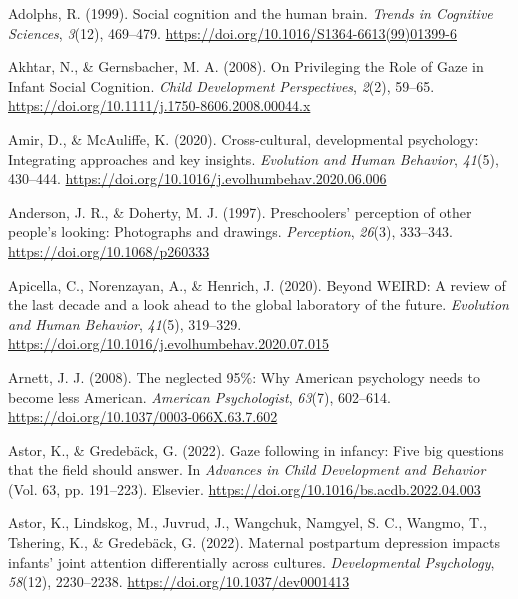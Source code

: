 \documentclass[
  man,floatsintext]{apa7}
\newlength{\cslhangindent}
\newenvironment{CSLReferences}[2] %
 {\begin{list}{}{%
  \setlength{\itemindent}{0pt}
  \setlength{\leftmargin}{0pt}
  \setlength{\parsep}{0pt}
  \ifodd #1
   \setlength{\leftmargin}{\cslhangindent}
   \setlength{\itemindent}{-1\cslhangindent}
  \fi
  \setlength{\itemsep}{#2\baselineskip}}}
 {\end{list}}
\begin{document}
\label{refs}
\begin{CSLReferences}{1}{0}
Adolphs, R. (1999). Social cognition and the human brain. \emph{Trends in Cognitive Sciences}, \emph{3}(12), 469--479. \url{https://doi.org/10.1016/S1364-6613(99)01399-6}

Akhtar, N., \& Gernsbacher, M. A. (2008). On {Privileging} the {Role} of {Gaze} in {Infant Social Cognition}. \emph{Child Development Perspectives}, \emph{2}(2), 59--65. \url{https://doi.org/10.1111/j.1750-8606.2008.00044.x}

Amir, D., \& McAuliffe, K. (2020). Cross-cultural, developmental psychology: Integrating approaches and key insights. \emph{Evolution and Human Behavior}, \emph{41}(5), 430--444. \url{https://doi.org/10.1016/j.evolhumbehav.2020.06.006}

Anderson, J. R., \& Doherty, M. J. (1997). Preschoolers' perception of other people's looking: {Photographs} and drawings. \emph{Perception}, \emph{26}(3), 333--343. \url{https://doi.org/10.1068/p260333}

Apicella, C., Norenzayan, A., \& Henrich, J. (2020). Beyond {WEIRD}: {A} review of the last decade and a look ahead to the global laboratory of the future. \emph{Evolution and Human Behavior}, \emph{41}(5), 319--329. \url{https://doi.org/10.1016/j.evolhumbehav.2020.07.015}

Arnett, J. J. (2008). The neglected 95\%: {Why American} psychology needs to become less {American}. \emph{American Psychologist}, \emph{63}(7), 602--614. \url{https://doi.org/10.1037/0003-066X.63.7.602}

Astor, K., \& Gredebäck, G. (2022). Gaze following in infancy: {Five} big questions that the field should answer. In \emph{Advances in {Child Development} and {Behavior}} (Vol. 63, pp. 191--223). Elsevier. \url{https://doi.org/10.1016/bs.acdb.2022.04.003}

Astor, K., Lindskog, M., Juvrud, J., Wangchuk, Namgyel, S. C., Wangmo, T., Tshering, K., \& Gredebäck, G. (2022). Maternal postpartum depression impacts infants' joint attention differentially across cultures. \emph{Developmental Psychology}, \emph{58}(12), 2230--2238. \url{https://doi.org/10.1037/dev0001413}


\end{CSLReferences}
\end{document}
